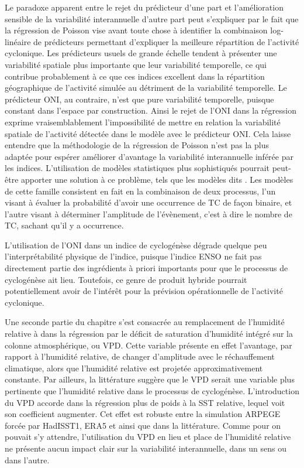 \documentclass[../main.tex]{subfiles}
\begin{document}
Le paradoxe apparent entre le rejet du prédicteur d'une part et l'amélioration sensible de la variabilité interannuelle d'autre part peut s'expliquer par le
fait que la régression de Poisson vise avant toute chose à identifier la combinaison log-linéaire de prédicteurs permettant d'expliquer la meilleure répartition
de l'activité cyclonique. Les prédicteurs usuels de grande échelle tendent à présenter une variabilité spatiale plus importante que leur variabilité temporelle,
ce qui contribue probablement à ce que ces indices excellent dans la répartition géographique de l'activité simulée au détriment de la variabilité temporelle.
Le prédicteur ONI, au contraire, n'est que pure variabilité temporelle, puisque constant dans l'espace par construction. Ainsi le rejet de l'ONI dans la
régression exprime vraisemblablement l'impossibilité de mettre en relation la variabilité spatiale de l'activité détectée dans le modèle avec le prédicteur ONI.
Cela laisse entendre que la méthodologie de la régression de Poisson n'est pas la plus adaptée pour espérer améliorer d'avantage la variabilité interannuelle
inférée par les indices. L'utilisation de modèles statistiques plus sophistiqués pourrait peut-être apporter une solution à ce problème, tels que les modèles
dits . Les modèles de cette famille consistent en fait en la combinaison de deux processus, l'un visant à évaluer la probabilité d'avoir une
occurrence de TC de façon binaire, et l'autre visant à déterminer l'amplitude de l'évènement, c'est à dire le nombre de TC, sachant qu'il y a occurrence.

L'utilisation de l'ONI dans un indice de cyclogénèse dégrade quelque peu l'interprétabilité physique de l'indice, puisque l'indice ENSO ne fait pas directement
partie des ingrédients à priori importants pour que le processus de cyclogénèse ait lieu. Toutefois, ce genre de produit hybride pourrait potentiellement avoir
de l'intérêt pour la prévision opérationnelle de l'activité cyclonique.

Une seconde partie du chapitre s'est consacrée au remplacement de l'humidité relative à  dans la régression par le déficit de saturation d'humidité
intégré sur la colonne atmosphérique, ou VPD. Cette variable présente en effet l'avantage, par rapport à l'humidité relative, de changer d'amplitude avec le
réchauffement climatique, alors que l'humidité relative est projetée approximativement constante. Par ailleurs, la littérature suggère que le VPD serait une
variable plus pertinente que l'humidité relative dans le processus de cyclogénèse. L'introduction du VPD accorde dans la régression plus de poids à la SST
relative, lequel voit son coefficient augmenter. Cet effet est robuste entre la simulation ARPEGE forcée par HadISST1, ERA5 et ainsi que dans la littérature.
Comme pour on pouvait s'y attendre, l'utilisation du VPD en lieu et place de l'humidité relative ne présente aucun impact clair sur la variabilité interannuelle,
dans un sens ou dans l'autre.
\end{document}
